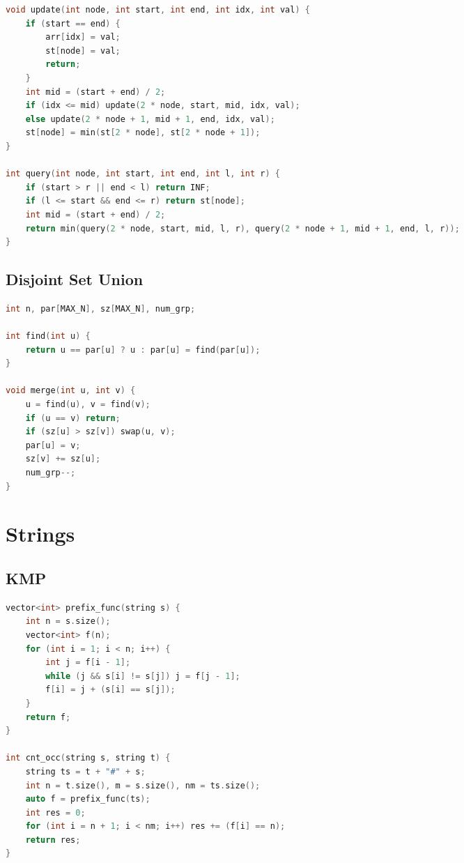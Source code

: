 \documentclass{article}
\begin{document}
\begin{multicols}{2}
\begin{lstlisting}[linewidth=\columnwidth,breaklines=true,language=C++]
void update(int node, int start, int end, int idx, int val) {
    if (start == end) {
        arr[idx] = val;
        st[node] = val;
        return;
    }
    int mid = (start + end) / 2;
    if (idx <= mid) update(2 * node, start, mid, idx, val);
    else update(2 * node + 1, mid + 1, end, idx, val);
    st[node] = min(st[2 * node], st[2 * node + 1]);
}

int query(int node, int start, int end, int l, int r) {
    if (start > r || end < l) return INF;
    if (l <= start && end <= r) return st[node];
    int mid = (start + end) / 2;
    return min(query(2 * node, start, mid, l, r), query(2 * node + 1, mid + 1, end, l, r)); 
}
\end{lstlisting}
\subsection{Disjoint Set Union}
\lstset {    language=C++,
    basicstyle=\small\ttfamily,
    numbers=left,
    breaklines=true,
    tabsize=4}
\begin{lstlisting}[linewidth=\columnwidth,breaklines=true,language=C++]
int n, par[MAX_N], sz[MAX_N], num_grp;
 
int find(int u) {
    return u == par[u] ? u : par[u] = find(par[u]);
}
 
void merge(int u, int v) {
    u = find(u), v = find(v);
    if (u == v) return;
    if (sz[u] > sz[v]) swap(u, v);
    par[u] = v;
    sz[v] += sz[u];
    num_grp--;
}
\end{lstlisting}
\section{Strings}
\subsection{KMP}
\lstset {    language=C++,
    basicstyle=\small\ttfamily,
    numbers=left,
    breaklines=true,
    tabsize=4}
\begin{lstlisting}[linewidth=\columnwidth,breaklines=true,language=C++]
vector<int> prefix_func(string s) {
    int n = s.size();
    vector<int> f(n); 
    for (int i = 1; i < n; i++) {
        int j = f[i - 1];
        while (j && s[i] != s[j]) j = f[j - 1];
        f[i] = j + (s[i] == s[j]);
    }
    return f;
}
 
int cnt_occ(string s, string t) {
    string ts = t + "#" + s;
    int n = t.size(), m = s.size(), nm = ts.size();
    auto f = prefix_func(ts);
    int res = 0;
    for (int i = n + 1; i < nm; i++) res += (f[i] == n);
    return res;
}
 

\end{lstlisting}
\end{multicols}
\end{document}
